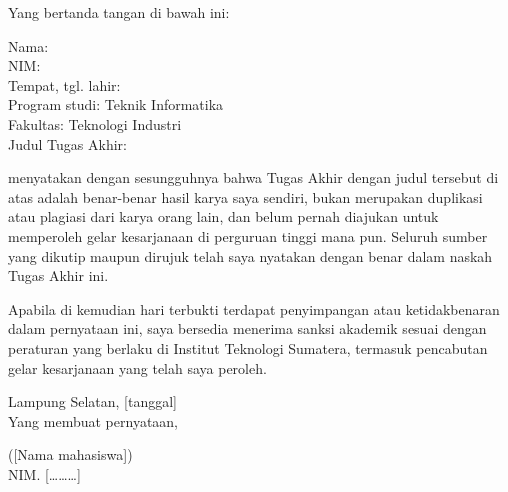 
\noindent Yang bertanda tangan di bawah ini:\par
\vspace{3pt}
\noindent Nama: \placeholder{[………]}\\
NIM: \placeholder{[………]}\\
Tempat, tgl. lahir: \placeholder{[………]}\\
Program studi: Teknik Informatika\\
Fakultas: Teknologi Industri\\
Judul Tugas Akhir: \placeholder{[………]}\par
\vspace{6pt}

\noindent menyatakan dengan sesungguhnya bahwa Tugas Akhir dengan judul tersebut di atas adalah benar-benar hasil karya saya sendiri, bukan merupakan duplikasi atau plagiasi dari karya orang lain, dan belum pernah diajukan untuk memperoleh gelar kesarjanaan di perguruan tinggi mana pun. Seluruh sumber yang dikutip maupun dirujuk telah saya nyatakan dengan benar dalam naskah Tugas Akhir ini.\par
\vspace{6pt}

\noindent Apabila di kemudian hari terbukti terdapat penyimpangan atau ketidakbenaran dalam pernyataan ini, saya bersedia menerima sanksi akademik sesuai dengan peraturan yang berlaku di Institut Teknologi Sumatera, termasuk pencabutan gelar kesarjanaan yang telah saya peroleh.\par
\vspace{14pt}

\begin{flushright}
Lampung Selatan, [tanggal]\\
Yang membuat pernyataan,\par
\vspace{1.0cm}
\placeholder{[Materai Rp10.000]}\par
\vspace{0.8cm}
([Nama mahasiswa])\\
NIM. [………]
\end{flushright}
\clearpage
